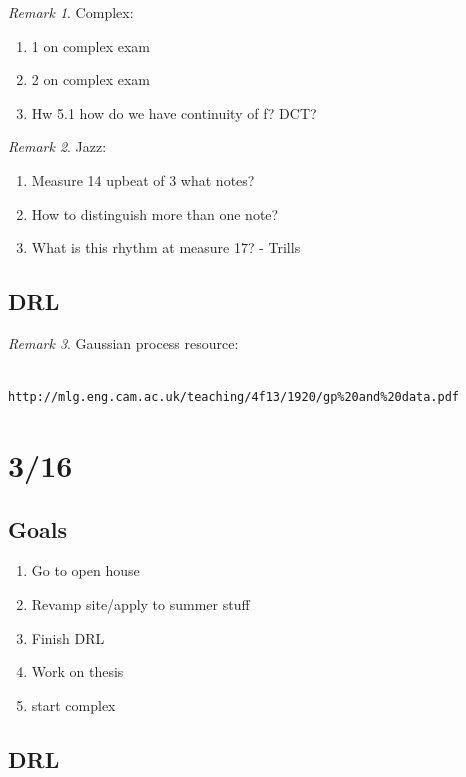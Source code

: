 \documentclass[11pt]{article}
\theoremstyle{remark}
\newtheorem{remark}{Remark}
\begin{document}
\begin{remark}
Complex:
\begin{enumerate}
	\item 1 on complex exam
	\item 2 on complex exam
	\item Hw 5.1 how do we have continuity of f? DCT?
\end{enumerate}
\end{remark}

\begin{remark}
Jazz:
\begin{enumerate}
	\item Measure 14 upbeat of 3 what notes?
	\item How to distinguish more than one note?
	\item What is this rhythm at measure 17? - Trills
\end{enumerate}
\end{remark}

\subsection{DRL}

\begin{remark}
	Gaussian process resource:
	\begin{verbatim}
		http://mlg.eng.cam.ac.uk/teaching/4f13/1920/gp%20and%20data.pdf
	\end{verbatim}
\end{remark}

\section{3/16}

\subsection{Goals}

\begin{enumerate}
	\item Go to open house
	\item Revamp site/apply to summer stuff
	\item Finish DRL
	\item Work on thesis
	\item start complex
\end{enumerate}

\subsection{DRL}
\end{document}
